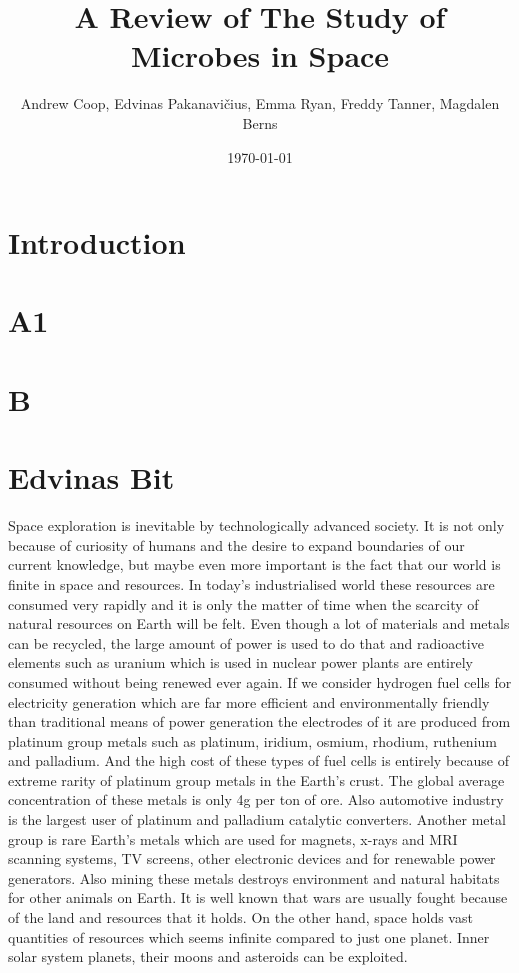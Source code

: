 \documentclass[12pt]{article}
\title{A Review of The Study of Microbes in Space}
\author{Andrew Coop, Edvinas Pakanavičius, Emma Ryan, Freddy Tanner, Magdalen Berns}
\date{\today}
\begin{document}
\maketitle
\thispagestyle{empty}

\begin{abstract}
\noindent

\end{abstract}

\clearpage
\tableofcontents
\thispagestyle{empty}
\clearpage

\section{Introduction}
\section{A1}
\section{B}
\section{Edvinas Bit}

Space exploration is inevitable by technologically advanced society. It is not only because of curiosity of humans and the desire to expand boundaries of our current knowledge, but maybe even more important is the fact that our world is finite in space and resources. In today’s industrialised world these resources are consumed very rapidly and it is only the matter of time when the scarcity of natural resources on Earth will be felt. Even though a lot of materials and
metals can be recycled, the large amount of power is used to do that and radioactive elements such as uranium which is used in nuclear power plants are entirely consumed without being renewed ever again. If we consider hydrogen fuel cells for electricity generation which are far more efficient and environmentally friendly than traditional means of power generation the electrodes of it are produced from platinum group metals such as platinum, iridium, osmium, rhodium, ruthenium and palladium. And the high cost of these types of fuel cells is entirely because of extreme rarity of platinum group metals in the Earth’s crust. The global average concentration of these metals is only 4g per ton of ore. Also automotive industry is the largest
user of platinum and palladium catalytic converters. Another metal group is rare Earth's metals which are used for magnets, x-rays and MRI scanning systems, TV screens, other electronic devices and for renewable power generators. Also mining these metals destroys environment and natural habitats for other animals on Earth. It is well known that wars are usually fought because of the land and resources that it holds. On the other hand, space holds vast quantities of
resources which seems infinite compared to just one planet. Inner solar system planets, their moons and asteroids can be exploited.
\end{document}
